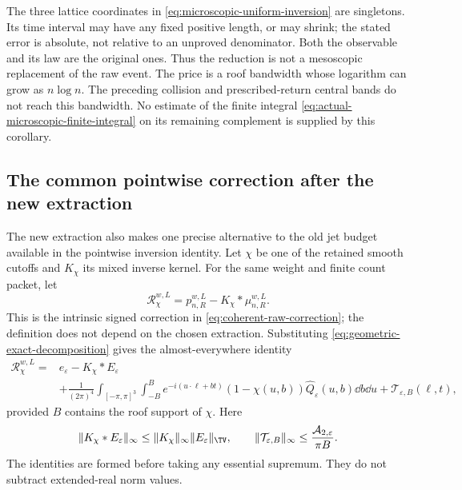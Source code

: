 \begin{remark}
\label{rem:microscopic-reduction-not-LLT}
The three lattice coordinates in \eqref{eq:microscopic-uniform-inversion}
are singletons. Its time interval may have any fixed positive length,
or may shrink; the stated error is absolute, not relative to an
unproved denominator. Both the observable and its law are the original
ones. Thus the reduction is not a mesoscopic replacement of the raw
event. The price is a roof bandwidth whose logarithm can grow as
$n\log n$. The preceding collision and prescribed-return central
bands do not reach this bandwidth. No estimate of the finite integral
\eqref{eq:actual-microscopic-finite-integral} on its remaining complement
is supplied by this corollary.
\end{remark}

\subsection{The common pointwise correction after the new extraction}
The new extraction also makes one precise alternative to the old jet
budget available in the pointwise inversion identity. Let $\chi$ be one
of the retained smooth cutoffs and $K_\chi$ its mixed inverse kernel.
For the same weight and finite count packet, let
\[
 \mathcal R_\chi^{w,L}=p_{n,R}^{w,L}-K_\chi*\mu_{n,R}^{w,L}.
\]
This is the intrinsic signed correction in
\eqref{eq:coherent-raw-correction}; the definition does not
depend on the chosen extraction. Substituting
\eqref{eq:geometric-exact-decomposition} gives the almost-everywhere
identity
\begin{equation}\label{eq:geometric-common-raw-ledger}
 \begin{split}
 \mathcal R_\chi^{w,L}
 ={}& e_\varepsilon-K_\chi*E_\varepsilon\\
 &+\frac1{(2\pi)^4}\int_{[-\pi,\pi]^3}\int_{-B}^B
 e^{-i(u\cdot\ell+bt)}(1-\chi(u,b))
                               \widehat Q_\varepsilon(u,b)\dd b\dd u
   +\mathcal T_{\varepsilon,B}(\ell,t),
 \end{split}
\end{equation}
provided $B$ contains the roof support of $\chi$. Here
\begin{equation}\label{eq:geometric-ledger-controlled-terms}
 \|K_\chi*E_\varepsilon\|_\infty
      \le\|K_\chi\|_\infty\|E_\varepsilon\|_{\TV},
 \qquad
 \|\mathcal T_{\varepsilon,B}\|_\infty
      \le\frac{\mathcal A_{2,\varepsilon}}{\pi B}.
\end{equation}
The identities are formed before taking any essential supremum.
They do not subtract extended-real norm values.

